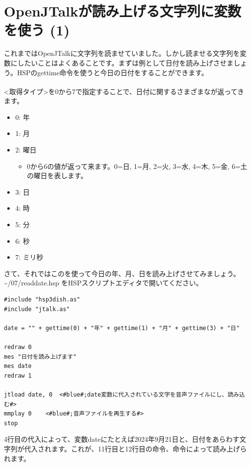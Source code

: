 \newpage
\section{OpenJTalkが読み上げる文字列に変数を使う (1)}
これまではOpenJTalkに文字列を読ませていました。しかし読ませる文字列を変数にしたいことはよくあることです。まずは例として日付を読み上げさせましょう。HSPのgettime命令を使うと今日の日付をすることができます。\\
\\
<取得タイプ>を0から7で指定することで、日付に関するさまざまなが返ってきます。
\begin{itemize}
\item 0: 年
\item 1: 月
\item 2: 曜日
\begin{itemize}
 \item 0から6の値が返って来ます。0=日, 1=月, 2=火, 3=水, 4=木, 5=金, 6=土 の曜日を表します。
\end{itemize}
\item 3: 日
\item 4: 時
\item 5: 分
\item 6: 秒
\item 7: ミリ秒
\end{itemize}
さて、それではこのを使って今日の年、月、日を読み上げさせてみましょう。 \textasciitilde /07/readdate.hsp をHSPスクリプトエディタで開いてください。\\

\begin{lstlisting}[caption=readdate.hsp,label=readdate.hsp]
#include "hsp3dish.as"
#include "jtalk.as"

date = "" + gettime(0) + "年" + gettime(1) + "月" + gettime(3) + "日"

redraw 0
mes "日付を読み上げます"
mes date
redraw 1

jtload date, 0	<#blue#;date変数に代入されている文字を音声ファイルにし、読み込む#>
mmplay 0	<#blue#;音声ファイルを再生する#>
stop
\end{lstlisting}

4行目の代入によって、変数dateにたとえば2024年9月21日と、日付をあらわす文字列が代入されます。これが、11行目と12行目の命令、命令によって読み上げられます。\\

\begin{tcolorbox}[title=\useOmetoi]
\begin{enumerate}
\end{enumerate}
\end{tcolorbox}
